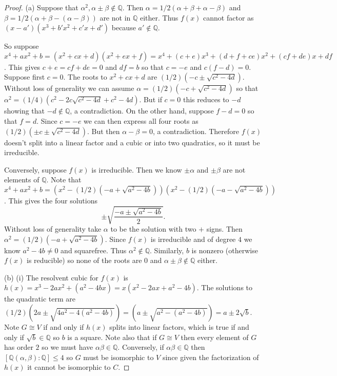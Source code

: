 \documentclass{article}
\begin{document}
\begin{proof}
(a) Suppose that $\alpha^2, \alpha \pm \beta \notin \mathbb{Q}$. Then $\alpha = 1/2(\alpha + \beta + \alpha - \beta)$ and $\beta = 1/2(\alpha + \beta - (\alpha - \beta))$ are not in $\mathbb{Q}$ either. Thus $f(x)$ cannot factor as $(x-a')(x^3 + b'x^2 + c'x + d')$ because $a' \notin \mathbb{Q}$.

So suppose $x^4 + ax^2 + b = (x^2 + cx + d)(x^2 + ex + f) = x^4 + (c + e)x^3 + (d + f + ce)x^2 + (cf + de)x + df$. This gives $c + e = cf + de = 0$ and $df = b$ so that $c = -e$ and $c(f-d) = 0$. Suppose first $c = 0$. The roots to $x^2 + cx + d$ are $(1/2)(-c \pm \sqrt{c^2 - 4d})$. Without loss of generality we can assume $\alpha = (1/2)(-c + \sqrt{c^2 - 4d})$ so that $\alpha^2 = (1/4)(c^2 - 2c\sqrt{c^2 - 4d} + c^2 - 4d)$. But if $c = 0$ this reduces to $-d$ showing that $-d \notin \mathbb{Q}$, a contradiction. On the other hand, suppose $f-d = 0$ so that $f = d$. Since $c = -e$ we can then express all four roots as $(1/2)(\pm c \pm \sqrt{c^2 - 4d})$. But then $\alpha - \beta = 0$, a contradiction. Therefore $f(x)$ doesn't split into a linear factor and a cubic or into two quadratics, so it must be irreducible.

Conversely, suppose $f(x)$ is irreducible. Then we know $\pm \alpha$ and $\pm \beta$ are not elements of $\mathbb{Q}$. Note that $x^4 + ax^2 + b = (x^2 - (1/2)(-a + \sqrt{a^2 - 4b}))(x^2 - (1/2)(-a - \sqrt{a^2 - 4b}))$. This gives the four solutions
\[
\pm \sqrt{\frac{-a \pm \sqrt{a^2 - 4b}}{2}}.
\]
Without loss of generality take $\alpha$ to be the solution with two $+$ signs. Then $\alpha^2 = (1/2)(-a + \sqrt{a^2 - 4b})$. Since $f(x)$ is irreducible and of degree $4$ we know $a^2 - 4b \neq 0$ and squarefree. Thus $\alpha^2 \notin \mathbb{Q}$. Similarly, $b$ is nonzero (otherwise $f(x)$ is reducible) so none of the roots are $0$ and $\alpha \pm \beta \notin \mathbb{Q}$ either.

(b) (i) The resolvent cubic for $f(x)$ is $h(x) = x^3 - 2ax^2 + (a^2-4bx) = x(x^2 - 2ax + a^2 - 4b)$. The solutions to the quadratic term are $(1/2)(2a \pm \sqrt{4a^2 - 4(a^2-4b)}) = (a \pm \sqrt{a^2 - (a^2 - 4b)}) = a \pm 2\sqrt{b}$. Note $G \cong V$ if and only if $h(x)$ splits into linear factors, which is true if and only if $\sqrt{b} \in \mathbb{Q}$ so $b$ is a square. Note also that if $G \cong V$ then every element of $G$ has order $2$ so we must have $\alpha \beta \in \mathbb{Q}$. Conversely, if $\alpha \beta \in \mathbb{Q}$ then $[\mathbb{Q}(\alpha, \beta) : \mathbb{Q}] \leq 4$ so $G$ must be isomorphic to $V$ since given the factorization of $h(x)$ it cannot be isomorphic to $C$.


\end{proof}
\end{document}
